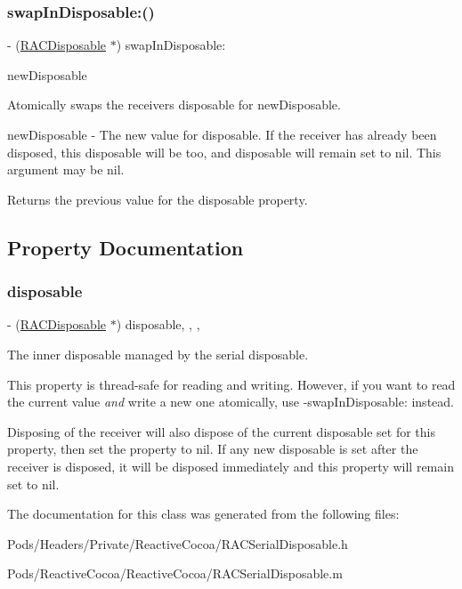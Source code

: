 \subsubsection{\texorpdfstring{swap\+In\+Disposable\+:()}{swapInDisposable:()}\hspace{0.1cm}{\footnotesize\ttfamily [3/3]}}
{\footnotesize\ttfamily -\/ (\mbox{\hyperlink{interface_r_a_c_disposable}{R\+A\+C\+Disposable}} $\ast$) swap\+In\+Disposable\+: \begin{DoxyParamCaption}\item[{(\mbox{\hyperlink{interface_r_a_c_disposable}{R\+A\+C\+Disposable}} $\ast$)}]{new\+Disposable }\end{DoxyParamCaption}}

Atomically swaps the receiver\textquotesingle{}s {\ttfamily disposable} for {\ttfamily new\+Disposable}.

new\+Disposable -\/ The new value for {\ttfamily disposable}. If the receiver has already been disposed, this disposable will be too, and {\ttfamily disposable} will remain set to nil. This argument may be nil.

Returns the previous value for the {\ttfamily disposable} property. 

\subsection{Property Documentation}
\mbox{\label{interface_r_a_c_serial_disposable_ab449303ac26a4a3a0555eb9b27e8c5cc}} 
\subsubsection{\texorpdfstring{disposable}{disposable}}
{\footnotesize\ttfamily -\/ (\mbox{\hyperlink{interface_r_a_c_disposable}{R\+A\+C\+Disposable}} $\ast$) disposable\hspace{0.3cm}{\ttfamily [read]}, {\ttfamily [write]}, {\ttfamily [atomic]}, {\ttfamily [strong]}}

The inner disposable managed by the serial disposable.

This property is thread-\/safe for reading and writing. However, if you want to read the current value {\itshape and} write a new one atomically, use -\/swap\+In\+Disposable\+: instead.

Disposing of the receiver will also dispose of the current disposable set for this property, then set the property to nil. If any new disposable is set after the receiver is disposed, it will be disposed immediately and this property will remain set to nil. 

The documentation for this class was generated from the following files\+:\begin{DoxyCompactItemize}
\item 
Pods/\+Headers/\+Private/\+Reactive\+Cocoa/R\+A\+C\+Serial\+Disposable.\+h\item 
Pods/\+Reactive\+Cocoa/\+Reactive\+Cocoa/R\+A\+C\+Serial\+Disposable.\+m\end{DoxyCompactItemize}
